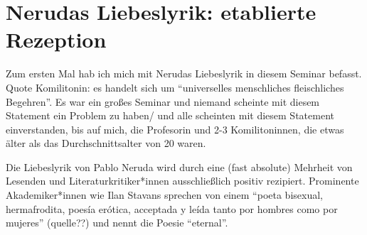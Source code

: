 \section{Nerudas Liebeslyrik: etablierte Rezeption}


Zum ersten Mal hab ich mich mit Nerudas Liebeslyrik in diesem Seminar befasst.
Quote Komilitonin: es handelt sich um ``universelles menschliches fleischliches Begehren''.
Es war ein großes Seminar und niemand scheinte mit diesem Statement ein Problem zu haben/ und alle scheinten mit diesem Statement einverstanden, bis auf mich, die Profesorin und 2-3 Komilitoninnen, die etwas älter als das Durchschnittsalter von 20 waren.

Die Liebeslyrik von Pablo Neruda wird durch eine (fast absolute) Mehrheit von Lesenden und Literaturkritiker*innen ausschließlich positiv rezipiert.
Prominente Akademiker*innen wie Ilan Stavans sprechen von einem ``poeta bisexual, hermafrodita, poesía erótica, acceptada y leída tanto por hombres como por mujeres'' (quelle??)
und nennt die Poesie ``eternal''\cite{Stavans2014}.

